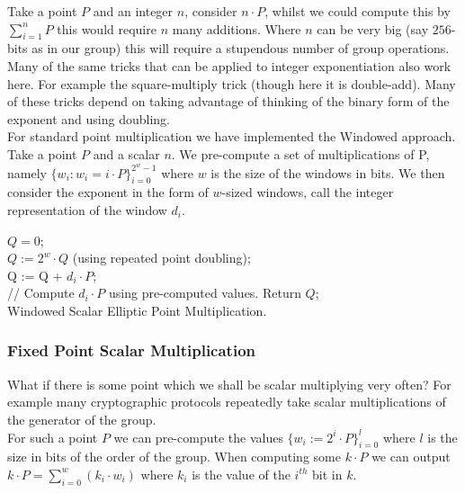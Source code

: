 \documentclass[ %
                    author={Nicholas Tutte},
                supervisor={Prof. Nigel Smart},
                    degree={MEng},
                     title={Secure Two Party Computation},
                  subtitle={A practical comparison of recent protocols},
                      type={Research - GG1K},
                      year={2015} ]{dissertation}
\begin{document}
\begin{appendices}
					Take a point $P$ and an integer $n$, consider $n \cdot P$, whilst we could compute this by $\sum_{i = 1}^{n}P$ this would require $n$ many additions. Where $n$ can be very big (say $256$-bits as in our group) this will require a stupendous number of group operations.\\

					Many of the same tricks that can be applied to integer exponentiation also work here. For example the square-multiply trick (though here it is double-add). Many of these tricks depend on taking advantage of thinking of the binary form of the exponent and using doubling.\\

					For standard point multiplication we have implemented the Windowed approach. Take a point $P$ and a scalar $n$. We pre-compute a set of multiplications of P, namely $\{w_i : w_i = i \cdot P\}_{i = 0}^{2^w - 1}$ where $w$ is the size of the windows in bits. We then consider the exponent in the form of $w$-sized windows, call the integer representation of the window $d_i$.

					\begin{mdframed}
						\begin{algorithm}[H]
							$Q = 0$;\\[0.25cm]
							{
								$Q := 2^w \cdot Q$ (using repeated point doubling);\\[0.25cm]
								{
									Q := Q + $d_i \cdot P$;\\[0.25cm]
									// Compute $d_i \cdot P$ using pre-computed values.
								}
							}
							Return $Q$;\\[0.25cm]

							\caption{Windowed Scalar Elliptic Point Multiplication.}
						\end{algorithm}

					\end{mdframed}

					\subsubsection{Fixed Point Scalar Multiplication}
						What if there is some point which we shall be scalar multiplying very often? For example many cryptographic protocols repeatedly take scalar multiplications of the generator of the group.\\

						For such a point $P$ we can pre-compute the values $\{w_i := 2^i \cdot P\}_{i = 0}^{l}$ where $l$ is the size in bits of the order of the group. When computing some $k \cdot P$ we can output $k \cdot P = \sum_{i = 0}^{w} (k_i \cdot w_i)$ where $k_i$ is the value of the $i^{th}$ bit in $k$.\\


\end{appendices}
\end{document}
